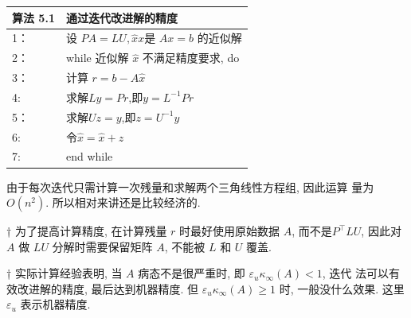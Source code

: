 \documentclass[12pt,a4paper]{article}
\begin{document}
\begin{table}  
	\begin{tabular*}{16cm}{ll}  
		\hline  
		算法 5.1 &通过迭代改进解的精度\\  
		\hline  
		1：   & 设 $P A = LU, \hat{x}x$是 $Ax = b$ 的近似解\\  
		2：   & while 近似解 $\hat{x}$ 不满足精度要求, do\\
		3：   & \qquad 计算 $r = b -A \hat{x}$ \\
		4:    & \qquad 求解$Ly=Pr$,即$y=L^{-1}Pr$\\
		5：    & \qquad 求解$Uz=y$,即$z=U^{-1}y$\\
		6:    & \qquad 令$\hat{x}=\hat{x}+z$\\
		7:    &end while\\
		\hline  
	\end{tabular*}  
\end{table}

由于每次迭代只需计算一次残量和求解两个三角线性方程组, 因此运算
量为 $O(n^2)$. 所以相对来讲还是比较经济的.

\begin{framed}
	† 为了提高计算精度, 在计算残量 $r$ 时最好使用原始数据 $A$, 而不是$P^{\top}LU$, 因此对 $A$ 做 $LU$ 分解时需要保留矩阵 $A$, 不能被 $L$ 和 $U$ 覆盖.
\end{framed}

\begin{framed}
	† 实际计算经验表明, 当 $A$ 病态不是很严重时, 即 $ε_uκ_∞(A) < 1$, 迭代
	法可以有效改进解的精度, 最后达到机器精度. 但 $ε_uκ_∞(A) ≥ 1$ 时,
	一般没什么效果. 这里 $ε_u$ 表示机器精度.
\end{framed}
\end{document}

